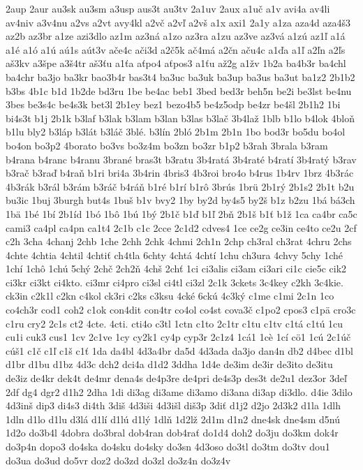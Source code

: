 {2aup
2aur
au3sk
au3sm
a3usp
aus3t
au3tv
2a1uv
2aux
a1uč
a1v
avi4a
av4li
av4niv
a3v4nu
a2vs
a2vt
avy4kl
a2vč
a2vľ
a2vš
a1x
axi1
2a1y
a1za
aza4d
aza4š3
az2b
az3br
a1ze
azi3dlo
az1m
az3ná
a1zo
az3ra
a1zu
az3ve
az3vá
a1zú
az1ľ
a1á
a1é
a1ó
a1ú
aú1s
aút3v
ače4c
ači3d
a2č5k
ač4má
a2čn
aču4c
a1ďa
a1ľ
a2ľn
a2ľs
aš3kv
a3špe
a3š4tr
aš3ťu
a1ťa
aťpo4
aťpos3
a1ťu
až2g
a1žv
1b2a
ba4b3r
ba4chl
ba4chr
ba3jo
ba3kr
bao3b4r
bas3t4
ba3uc
ba3uk
ba3up
ba3us
ba3ut
ba1z2
2b1b2
b3bs
4b1c
b1d
1b2de
bd3ru
1be
be4ac
beb1
3bed
bed3r
beh5n
be2i
be3lst
be4nu
3bes
be3s4c
be4s3k
bet3l
2b1ey
bez1
bezo4b5
be4z5odp
be4zr
be4šl
2b1h2
1bi
bi4s3t
b1j
2b1k
b3laf
b3lak
b3lam
b3lan
b3las
b3lač
3b4laž
1blb
b1lo
b4lok
4bloň
b1lu
bly2
b3láp
b3lát
b3láč
3blé.
b3lín
2bló
2b1m
2b1n
1bo
bod3r
bo5du
bo4ol
bo4on
bo3p2
4borato
bo3vs
bo3z4m
bo3zn
bo3zr
b1p2
b3rah
3brala
b3ram
b4rana
b4ranc
b4ranu
3brané
bras3t
b3ratu
3b4ratá
3b4raté
b4ratí
3b4ratý
b3rav
b3rač
b3raď
b4raň
b1ri
bri4a
3b4rin
4bris3
4b3roi
bro4o
b4rus
1b4rv
1brz
4b3rác
4b3rák
b3rál
b3rám
b3ráč
b4ráň
b1ré
b1rí
b1rô
3brús
1brü
2b1rý
2b1s2
2b1t
b2u
bu3ic
1buj
3burgh
but4s
1buš
b1v
bvy2
1by
by2d
by4s5
by2š
b1z
b2zu
1bá
bá3ch
1bä
1bé
1bí
2b1íd
1bó
1bô
1bú
1bý
2b1č
b1ď
b1ľ
2bň
2b1š
b1ť
b1ž
1ca
ca4br
ca5c
cami3
ca4pl
ca4pn
ca1t4
2c1b
c1c
2cce
2c1d2
cdves4
1ce
ce2g
ce3in
ce4to
ce2u
2cf
c2h
3cha
4chanj
2chb
1che
2chh
2chk
4chmi
2ch1n
2chp
ch3ral
ch3rat
4chru
2chs
4chte
4chtia
4chtil
4chtiť
ch4tla
6chty
4chtá
4chtí
1chu
ch3ura
4chvy
5chy
1ché
1chí
1chô
1chú
5chý
2chč
2ch2ň
4chš
2chť
1ci
ci3alis
ci3am
ci3ari
ci1c
cie5c
cik2
ci3kr
ci3kt
ci4kto.
ci3mr
ci4pro
ci3sl
ci4tl
ci3zl
2c1k
3ckets
3c4key
c2kh
3c4kie.
ck3in
c2k1l
c2kn
c4kol
ck3ri
c2ks
c3ksu
4cké
6ckú
4c3ký
c1me
c1mi
2c1n
1co
co4ch3r
cod1
coh2
c1ok
con4dit
con4tr
co4ol
co4st
cova3č
c1po2
cpos3
c1pä
cro3c
c1ru
cry2
2c1s
ct2
4cte.
4cti.
cti4o
c3tl
1ctn
c1to
2c1tr
c1tu
c1tv
c1tá
c1tú
1cu
cu1i
cuk3
cus1
1cv
2c1ve
1cy
cy2k1
cy4p
cyp3r
2c1z4
1cá1
1cè
1cí
cö1
1cú
2c1úč
cúš1
c1č
c1ľ
c1š
c1ť
1da
da4bl
4d3a4br
da5d
4d3ada
da3jo
dan4n
db2
d4bec
d1bl
d1br
d1bu
d1bz
4d3c
dch2
dci4a
d1d2
3ddha
1d4e
de3im
de3ir
de3ito
de3itu
de3iz
de4kr
dek4t
de4mr
dena4s
de4p3re
de4pri
de4s3p
des3t
de2u1
dez3or
3deľ
2df
dg4
dgr2
d1h2
2dha
1di
di3ag
di3ame
di3amo
di3ana
di3ap
di3dlo.
d4ie
3dilo
4d3inš
dip3
di4s3
di4th
3diš
4d3iši
4d3išl
diš3p
3diť
d1j2
d2jo
2d3k2
d1la
1dlh
1dln
d1lo
d1lu
d3lá
d1lí
d1lú
d1lý
1dlň
1d2lž
2d1m
d1n2
dne4sk
dne4sm
d5nú
1d2o
do3b4l
4dobra
do3bral
dob4ran
dob4rať
do1d4
doh2
do3ju
do3km
dok4r
do3p4n
dopo3
do4ska
do4sku
do4sky
do3sn
4d3oso
do3tl
do3tm
do3tv
dou1
do3ua
do3ud
do5vr
doz2
do3zd
do3zl
do3z4n
do3z4v
}
